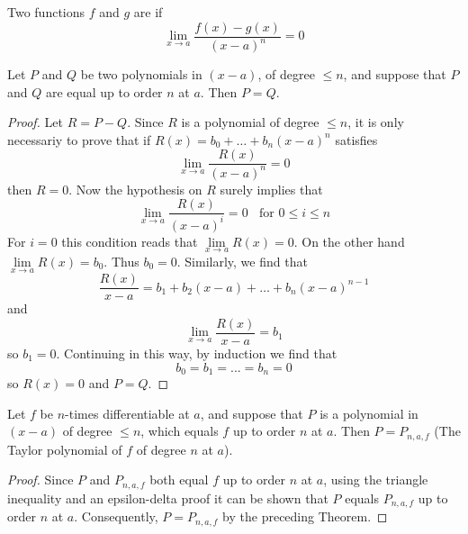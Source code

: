 \begin{defn}
    Two functions $f$ and $g$ are  if \begin{equation*}
        \lim\limits_{x\rightarrow a}\frac{f(x) - g(x)}{(x-a)^n} = 0
    \end{equation*}
\end{defn}


\begin{thm}
    Let $P$ and $Q$ be two polynomials in $(x-a)$, of degree $\leq n$, and suppose that $P$ and $Q$ are equal up to order $n$ at $a$. Then $P = Q$.
\end{thm}
\begin{proof}
    Let $R= P-Q$. Since $R$ is a polynomial of degree $\leq n$, it is only necessariy to prove that if $R(x) = b_0+\hdots +b_n(x-a)^n$ satisfies \begin{equation*}
        \lim\limits_{x\rightarrow a}\frac{R(x)}{(x-a)^n} = 0
    \end{equation*}
    then $R = 0$. Now the hypothesis on $R$ surely implies that \begin{equation*}
        \lim\limits_{x\rightarrow a}\frac{R(x)}{(x-a)^i} = 0\;\;\text{ for } 0\leq i \leq n
    \end{equation*}
    For $i = 0$ this condition reads that $\lim\limits_{x\rightarrow a}R(x) = 0$. On the other hand $\lim\limits_{x\rightarrow a}R(x) = b_0$. Thus $b_0 = 0$. Similarly, we find that \begin{equation*}
        \frac{R(x)}{x-a} = b_1+b_2(x-a)+\hdots + b_n(x-a)^{n-1}
    \end{equation*}
    and \begin{equation*}
        \lim\limits_{x\rightarrow a}\frac{R(x)}{x-a} = b_1
    \end{equation*}
    so $b_1 = 0$. Continuing in this way, by induction we find that \begin{equation*}
        b_0 = b_1 = ... = b_n = 0
    \end{equation*}
    so $R(x) = 0$ and $P = Q$.
\end{proof}


\begin{cor}
    Let $f$ be $n$-times differentiable at $a$, and suppose that $P$ is a polynomial in $(x-a)$ of degree $\leq n$, which equals $f$ up to order $n$ at $a$. Then $P = P_{n,a,f}$ (The Taylor polynomial of $f$ of degree $n$ at $a$).
\end{cor}
\begin{proof}
    Since $P$ and $P_{n,a,f}$ both equal $f$ up to order $n$ at $a$, using the triangle inequality and an epsilon-delta proof it can be shown that $P$ equals $P_{n,a,f}$ up to order $n$ at $a$. Consequently, $P = P_{n,a,f}$ by the preceding Theorem.
\end{proof}

